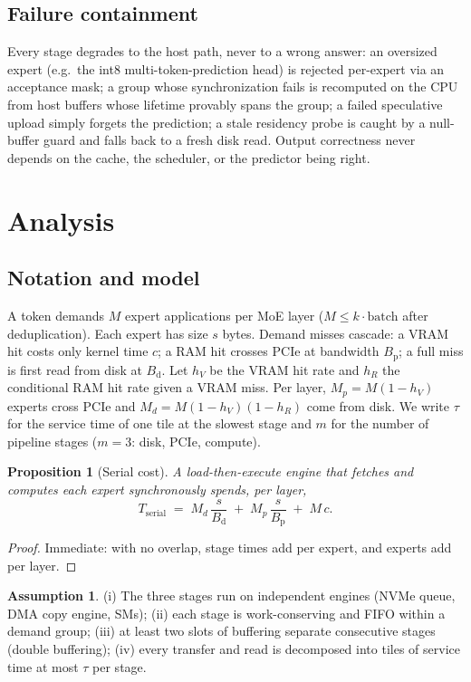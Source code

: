 \documentclass[11pt]{article}
\newtheorem{proposition}[theorem]{Proposition}
\theoremstyle{definition}
\newtheorem{assumption}[theorem]{Assumption}
\theoremstyle{remark}
\newcommand{\bd}{B_{\mathrm{d}}}
\newcommand{\bp}{B_{\mathrm{p}}}
\begin{document}
\subsection{Failure containment}
Every stage degrades to the host path, never to a wrong answer: an
oversized expert (e.g.\ the int8 multi-token-prediction head) is rejected
per-expert via an acceptance mask; a group whose synchronization fails is
recomputed on the CPU from host buffers whose lifetime provably spans the
group; a failed speculative upload simply forgets the prediction; a stale
residency probe is caught by a null-buffer guard and falls back to a fresh
disk read. Output correctness never depends on the cache, the scheduler, or
the predictor being right.

\section{Analysis}\label{sec:analysis}

\subsection{Notation and model}
A token demands $M$ expert applications per MoE layer ($M \le k \cdot
\text{batch}$ after deduplication). Each expert has size $s$ bytes. Demand
misses cascade: a VRAM hit costs only kernel time $c$; a RAM hit crosses
PCIe at bandwidth $\bp$; a full miss is first read from disk at $\bd$.
Let $h_V$ be the VRAM hit rate and $h_R$ the conditional RAM hit rate given
a VRAM miss. Per layer,
$M_p = M(1-h_V)$ experts cross PCIe and $M_d = M(1-h_V)(1-h_R)$ come from
disk. We write $\tau$ for the service time of one tile at the slowest stage
and $m$ for the number of pipeline stages ($m{=}3$: disk, PCIe, compute).

\begin{proposition}[Serial cost]\label{prop:serial}
A load-then-execute engine that fetches and computes each expert
synchronously spends, per layer,
\begin{equation}
T_{\mathrm{serial}} \;=\; M_d\,\frac{s}{\bd} \;+\; M_p\,\frac{s}{\bp}
\;+\; M\,c .
\end{equation}
\end{proposition}
\begin{proof}
Immediate: with no overlap, stage times add per expert, and experts add per
layer.
\end{proof}

\begin{assumption}\label{ass:pipe}
(i) The three stages run on independent engines (NVMe queue, DMA copy
engine, SMs); (ii) each stage is work-conserving and FIFO within a demand
group; (iii) at least two slots of buffering separate consecutive stages
(double buffering); (iv) every transfer and read is decomposed into tiles of
service time at most $\tau$ per stage.
\end{assumption}
\end{document}

